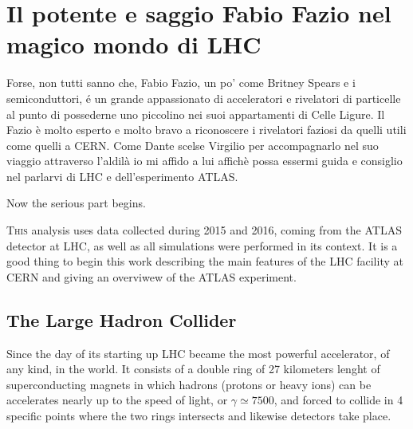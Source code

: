 \chapter{Il potente e saggio Fabio Fazio nel magico mondo di LHC}
Forse, non tutti sanno che, Fabio Fazio, un po' come Britney Spears e i semiconduttori, \'e un grande appassionato di acceleratori e rivelatori di particelle al punto di possederne uno piccolino nei suoi appartamenti di Celle Ligure. Il Fazio \`e molto esperto e molto bravo a riconoscere i rivelatori faziosi da quelli utili come quelli a CERN. Come Dante scelse Virgilio per accompagnarlo nel suo viaggio attraverso l'aldil\`a io mi affido a lui affich\`e possa essermi guida e consiglio nel parlarvi di LHC e dell'esperimento ATLAS.

Now the serious part begins.

\lettrine{T}{his} analysis uses data collected during 2015 and 2016, coming from the ATLAS detector at LHC, as well as all simulations were performed in its context. It is a good thing to begin this work describing the main features of the LHC facility at CERN and giving an overviwew of the ATLAS experiment.

\section{The Large Hadron Collider}
Since the day of its starting up LHC became the most powerful accelerator, of any kind, in the world. It consists of a double ring of 27 kilometers lenght of superconducting magnets in which hadrons (protons or heavy ions) can be accelerates nearly up to the speed of light, or $\gamma\simeq7500$, and forced to collide in 4 specific points where the two rings intersects and likewise detectors take place.

